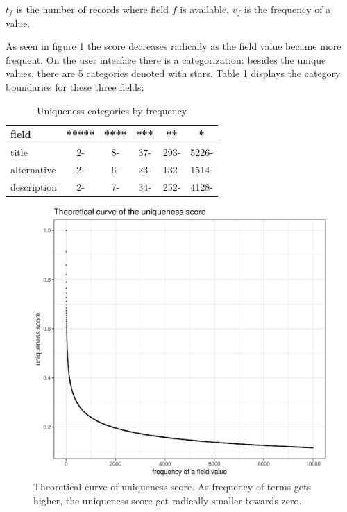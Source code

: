 $t_f$ is the number of records where field $f$ is available, $v_f$ is the frequency of a value.

As seen in figure \ref{figure:uniqueness-theoretical} the score decreases radically as the field value became more frequent. On the user interface there is a categorization: besides the unique values, there are 5 categories denoted with stars. Table \ref{table:uniqueness-boundaries} displays the category boundaries for these three fields:

\begin{table}
\caption{Uniqueness categories by frequency}
\label{table:uniqueness-boundaries}
\centering
\begin{tabular}{l|c|c|c|c|c}
field & ***** & **** & *** & ** & * \\
\hline
title & 2- & 8- & 37- & 293- & 5226- \\
alternative & 2- & 6- & 23- & 132- & 1514- \\
description & 2- & 7- & 34- & 252- & 4128-
\end{tabular}
\end{table}

\begin{figure}[ht]
\includegraphics[width=\textwidth]{images/chapter02/uniqueness-theoretical.eps}
\centering
\caption{Theoretical curve of uniqueness score. As frequency of terms gets higher, the uniqueness score get radically smaller towards zero.}
\label{figure:uniqueness-theoretical}
\end{figure}

